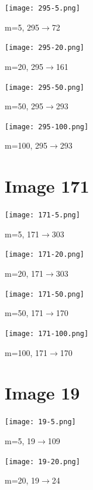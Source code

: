\documentclass{article}
\begin{document}
\begin{center}
    \texttt{[image: 295-5.png]}
    \caption{m=5, 295$\rightarrow$72}
\end{center}

\begin{center}
    \texttt{[image: 295-20.png]}
    \caption{m=20, 295$\rightarrow$161}
\end{center}

\begin{center}
    \texttt{[image: 295-50.png]}
    \caption{m=50, 295$\rightarrow$293}
\end{center}

\begin{center}
    \texttt{[image: 295-100.png]}
    \caption{m=100, 295$\rightarrow$293}
\end{center}

\section{Image 171}

\begin{center}
    \texttt{[image: 171-5.png]}
    \caption{m=5, 171$\rightarrow$303}
\end{center}

\begin{center}
    \texttt{[image: 171-20.png]}
    \caption{m=20, 171$\rightarrow$303}
\end{center}

\begin{center}
    \texttt{[image: 171-50.png]}
    \caption{m=50, 171$\rightarrow$170}
\end{center}

\begin{center}
    \texttt{[image: 171-100.png]}
    \caption{m=100, 171$\rightarrow$170}
\end{center}

\section{Image 19}

\begin{center}
    \texttt{[image: 19-5.png]}
    \caption{m=5, 19$\rightarrow$109}
\end{center}

\begin{center}
    \texttt{[image: 19-20.png]}
    \caption{m=20, 19$\rightarrow$24}
\end{center}
\end{document}
